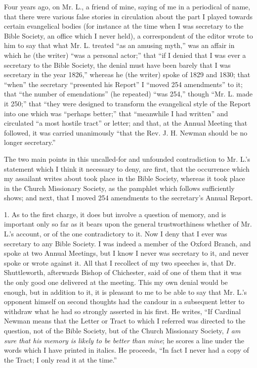 Four years ago, on Mr. L., a friend of mine,
saying of me in a periodical of name, that there were various false
stories in circulation about the part I played towards certain
evangelical bodies (for instance at the time when I was secretary to
the Bible Society, an office which I never held), a correspondent of
the editor wrote to him to say that what Mr. L. treated ``as an amusing
myth,'' was an affair in which he (the writer) ``was a personal actor;'' that ``if I denied that I was ever a secretary to the
Bible Society, the denial must have been barely that I was secretary
in the year 1826,'' whereas he (the writer) spoke of 1829 and 1830;
that ``when'' the secretary ``presented his Report'' I ``moved 254
amendments'' to it; that ``the number of emendations'' (he repeated) ``was
254,'' though ``Mr. L. made it 250;'' that ``they were designed to
transform the evangelical style of the Report into one which was ``perhaps
better;'' that ``meanwhile I had written'' and circulated ``a most
hostile tract'' or letter; and that, at the Annual Meeting that
followed, it was carried unanimously ``that the Rev. J. H. Newman
should be no longer secretary.''

The two main points in this uncalled-for and
unfounded contradiction to Mr. L.'s statement which I think it
necessary to deny, are first, that the occurrence which my assailant
writes about took place in the Bible Society, whereas it took place in
the Church Missionary Society, as the pamphlet which follows
sufficiently shows; and next, that I moved 254 amendments to the
secretary's Annual Report.

1. As to the first charge, it does but involve a
question of memory, and is important only so far as it bears upon the
general trustworthiness whether of Mr. L.'s account, or of the one
contradictory to it. Now I deny that I ever was secretary to any
Bible Society. I was indeed a member of the Oxford Branch, and spoke
at two Annual Meetings, but I know I never was secretary to it, and
never spoke or wrote against it. All that I recollect of my two
speeches is, that Dr. Shuttleworth, afterwards Bishop of Chichester,
said of one of them that it was the only good one delivered at the
meeting. This my own denial would be enough, but in addition to it, it
is pleasant to me to be able to say that Mr. L.'s opponent himself on
second thoughts had the candour in a subsequent letter to withdraw
what he had so strongly asserted in his first. He writes, ``If Cardinal
Newman means that the Letter or Tract to which I referred was directed
to the question, not of the Bible Society, but of the Church
Missionary Society, \emph{I am sure that his memory is likely to be
better than mine}; he scores a line under the words which I have
printed in italics. He proceeds, ``In fact I never had a copy of the
Tract; I only read it at the time.''

